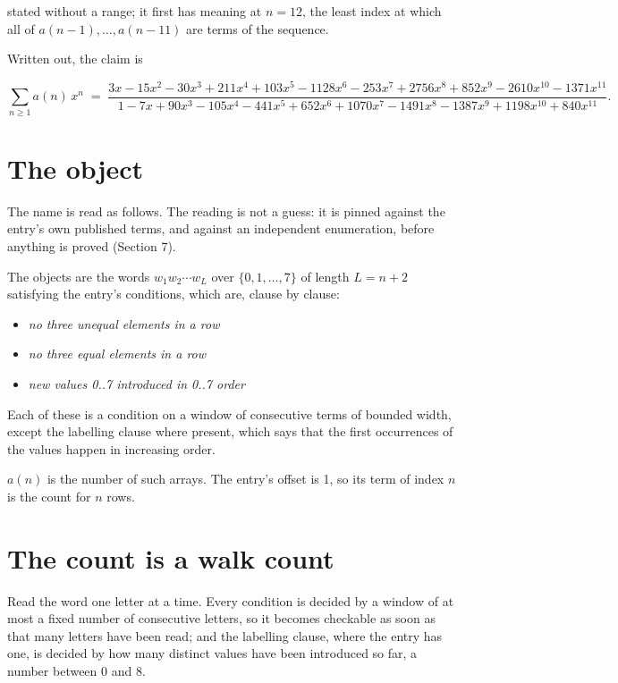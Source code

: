 \documentclass[11pt]{article}
\theoremstyle{definition}
\begin{document}
stated without a range; it first has meaning at $n = 12$, the least index at which all of $a(n-1),\dots,a(n-11)$ are terms of the sequence.

Written out, the claim is

\[\sum_{n \ge 1} a(n)\,x^n \;=\; \frac{3x - 15x^{2} - 30x^{3} + 211x^{4} + 103x^{5} - 1128x^{6} - 253x^{7} + 2756x^{8} + 852x^{9} - 2610x^{10} - 1371x^{11}}{1 - 7x + 90x^{3} - 105x^{4} - 441x^{5} + 652x^{6} + 1070x^{7} - 1491x^{8} - 1387x^{9} + 1198x^{10} + 840x^{11}}.\]

\section{The object}

The name is read as follows. The reading is not a guess: it is pinned against the entry's own published terms, and against an independent enumeration, before anything is proved (Section 7).

The objects are the words $w_1 w_2 \cdots w_L$ over $\{0,1,\dots,7\}$ of length $L = n + 2$ satisfying the entry's conditions, which are, clause by clause:

\begin{itemize}

\item {\itshape no three unequal elements in a row}

\item {\itshape no three equal elements in a row}

\item {\itshape new values 0..7 introduced in 0..7 order}

\end{itemize}

Each of these is a condition on a window of consecutive terms of bounded width, except the labelling clause where present, which says that the first occurrences of the values happen in increasing order.

$a(n)$ is the number of such arrays. The entry's offset is 1, so its term of index $n$ is the count for $n$ rows.

\section{The count is a walk count}

Read the word one letter at a time. Every condition is decided by a window of at most a fixed number of consecutive letters, so it becomes checkable as soon as that many letters have been read; and the labelling clause, where the entry has one, is decided by how many distinct values have been introduced so far, a number between $0$ and 8.
\end{document}
